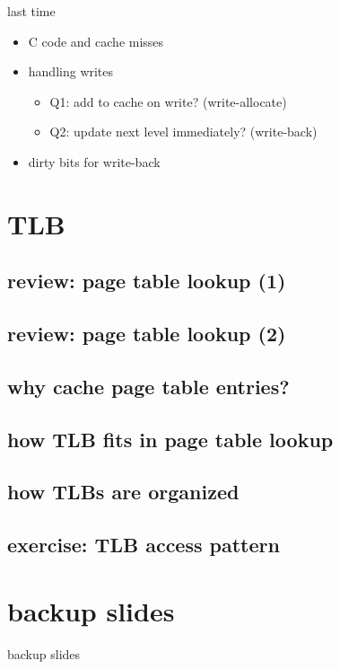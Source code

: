 \date{}
\title{}
\date{}

\begin{frame}
    \titlepage
\end{frame}


\usetikzlibrary{calc}

\begin{frame}{last time}
    \begin{itemize}
    \item C code and cache misses
    \item handling writes
        \begin{itemize}
        \item Q1: add to cache on write? (write-allocate)
        \item Q2: update next level immediately? (write-back)
        \end{itemize}
    \item dirty bits for write-back
    \end{itemize}
\end{frame}

\section{TLB}

\subsection{review: page table lookup (1)}


\subsection{review: page table lookup (2)}

\subsection{why cache page table entries?}


\subsection{how TLB fits in page table lookup}


\subsection{how TLBs are organized}

\subsection{exercise: TLB access pattern}






\section{backup slides}
\begin{frame}{backup slides}
\end{frame}


